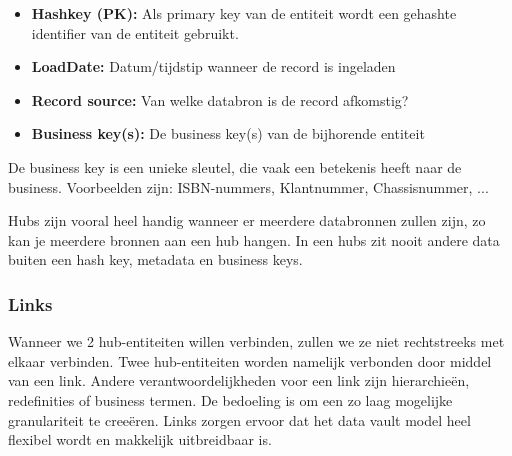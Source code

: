 \begin{itemize}
	\item \textbf{Hashkey (PK):} Als primary key van de entiteit wordt een gehashte identifier van de entiteit gebruikt.
	\item \textbf{LoadDate:} Datum/tijdstip wanneer de record is ingeladen
	\item \textbf{Record source:} Van welke databron is de record afkomstig?
	\item \textbf{Business key(s):} De business key(s) van de bijhorende entiteit
\end{itemize} 

 De business key is een unieke sleutel, die vaak een betekenis heeft naar de business. Voorbeelden zijn: ISBN-nummers, Klantnummer, Chassisnummer, ...
 
 Hubs zijn vooral heel handig wanneer er meerdere databronnen zullen zijn, zo kan je meerdere bronnen aan een hub hangen. In een hubs zit nooit andere data buiten een hash key, metadata en business keys.

\subsubsection{Links}
Wanneer we 2 hub-entiteiten willen verbinden, zullen we ze niet rechtstreeks met elkaar verbinden. Twee hub-entiteiten worden namelijk verbonden door middel van een link. Andere verantwoordelijkheden voor een link zijn hierarchieën, redefinities of business termen. De bedoeling is om een zo laag mogelijke granulariteit te creeëren. Links zorgen ervoor dat het data vault model heel flexibel wordt en makkelijk uitbreidbaar is. 

